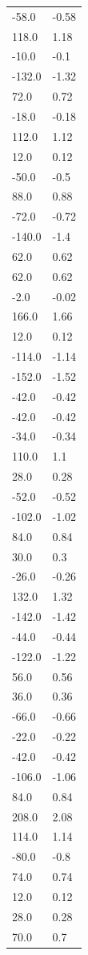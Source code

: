 \begin{longtable}{ll}
-58.0 & -0.58 \\
118.0 & 1.18 \\
-10.0 & -0.1 \\
-132.0 & -1.32 \\
72.0 & 0.72 \\
-18.0 & -0.18 \\
112.0 & 1.12 \\
12.0 & 0.12 \\
-50.0 & -0.5 \\
88.0 & 0.88 \\
-72.0 & -0.72 \\
-140.0 & -1.4 \\
62.0 & 0.62 \\
62.0 & 0.62 \\
-2.0 & -0.02 \\
166.0 & 1.66 \\
12.0 & 0.12 \\
-114.0 & -1.14 \\
-152.0 & -1.52 \\
-42.0 & -0.42 \\
-42.0 & -0.42 \\
-34.0 & -0.34 \\
110.0 & 1.1 \\
28.0 & 0.28 \\
-52.0 & -0.52 \\
-102.0 & -1.02 \\
84.0 & 0.84 \\
30.0 & 0.3 \\
-26.0 & -0.26 \\
132.0 & 1.32 \\
-142.0 & -1.42 \\
-44.0 & -0.44 \\
-122.0 & -1.22 \\
56.0 & 0.56 \\
36.0 & 0.36 \\
-66.0 & -0.66 \\
-22.0 & -0.22 \\
-42.0 & -0.42 \\
-106.0 & -1.06 \\
84.0 & 0.84 \\
208.0 & 2.08 \\
114.0 & 1.14 \\
-80.0 & -0.8 \\
74.0 & 0.74 \\
12.0 & 0.12 \\
28.0 & 0.28 \\
70.0 & 0.7 \\

\end{longtable}
